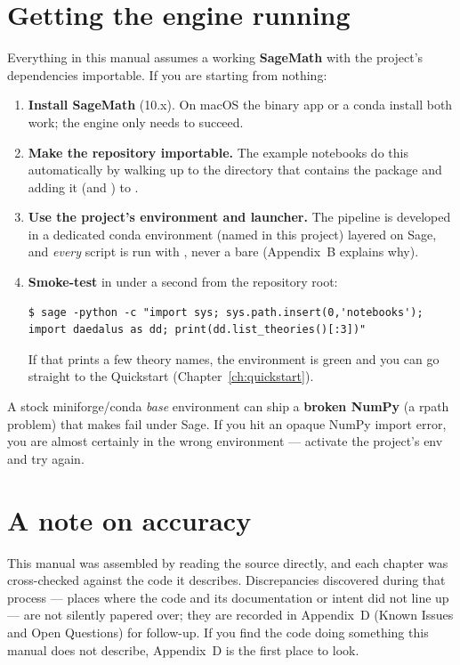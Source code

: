\section*{Getting the engine running}

Everything in this manual assumes a working \textbf{SageMath} with the project's
dependencies importable. If you are starting from nothing:
\begin{enumerate}
  \item \textbf{Install SageMath} (10.x). On macOS the binary app or a conda
        install both work; the engine only needs  to
        succeed.
  \item \textbf{Make the repository importable.} The example notebooks do this
        automatically by walking up to the directory that contains the
         package and adding it (and ) to
        .
  \item \textbf{Use the project's environment and launcher.} The pipeline is
        developed in a dedicated conda environment (named 
        in this project) layered on Sage, and \emph{every} script is run with
        , never a bare  (Appendix~B explains
        why).
  \item \textbf{Smoke-test} in under a second from the repository root:
\begin{lstlisting}[style=console]
$ sage -python -c "import sys; sys.path.insert(0,'notebooks'); import daedalus as dd; print(dd.list_theories()[:3])"
\end{lstlisting}
        If that prints a few theory names, the environment is green and you can
        go straight to the Quickstart (Chapter~\ref{ch:quickstart}).
\end{enumerate}

\begin{gotcha}
A stock miniforge/conda \emph{base} environment can ship a \textbf{broken NumPy}
(a  rpath problem) that makes  fail under
Sage. If you hit an opaque NumPy import error, you are almost certainly in the
wrong environment --- activate the project's  env and try
again.
\end{gotcha}

\section*{A note on accuracy}

This manual was assembled by reading the source directly, and each chapter was
cross-checked against the code it describes.  Discrepancies discovered during
that process --- places where the code and its documentation or intent did not
line up --- are not silently papered over; they are recorded in
Appendix~D (Known Issues and Open Questions) for follow-up.  If you find the code
doing something this manual does not describe, Appendix~D is the first place to
look.

